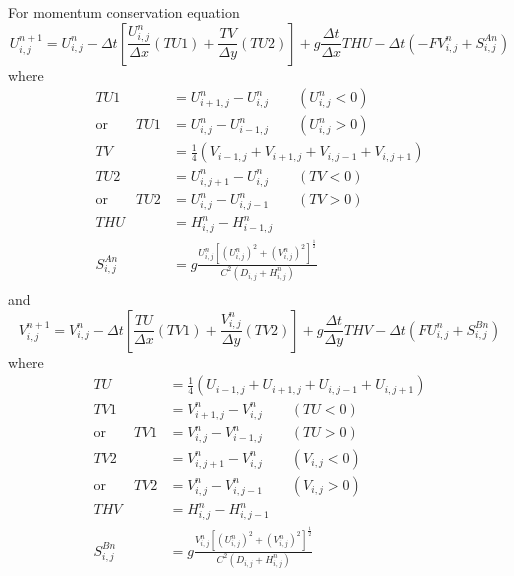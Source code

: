 \documentclass[10pt,a4paper]{article}
\begin{document}
For momentum conservation equation
\begin{equation}
	U_{i, j}^{n+1} = U_{i, j}^n - \Delta t\left[\frac{U_{i, j}^n}{\Delta x}(TU1) + \frac{TV}{\Delta y}(TU2)\right] + g\frac{\Delta t}{\Delta x}THU - \Delta t\left(-FV_{i, j}^n + S_{i, j}^{An}\right)
\end{equation}
where
\begin{equation}
	\begin{aligned}
		TU1 &= U_{i+1, j}^n - U_{i, j}^n\qquad (U_{i, j}^n < 0)\\
		\mbox{or} \qquad TU1 &= U_{i, j}^n - U_{i-1, j}^n\qquad (U_{i, j}^n > 0)\\
		TV &= \frac{1}{4}\left(V_{i-1, j} + V_{i+1, j} + V_{i, j-1} + V_{i, j+1}\right)\\
		TU2 &= U_{i, j+1}^n - U_{i, j}^n\qquad (TV < 0) \\
		\mbox{or} \qquad TU2 &= U_{i, j}^n - U_{i, j-1}^n\qquad (TV > 0) \\
		THU &= H_{i, j}^n - H_{i-1, j}^n \\
		S_{i, j}^{An} &= g\frac{U_{i, j}^n\left[(U_{i, j}^n)^2 + (V_{i, j}^n)^2\right]^{\frac{1}{2}}}{C^2(D_{i, j}+H_{i, j}^n)} \\
	\end{aligned}
\end{equation}
and
\begin{equation}
	V_{i, j}^{n+1} = V_{i, j}^n - \Delta t\left[\frac{TU}{\Delta x}(TV1) + \frac{V_{i, j}^n}{\Delta y}(TV2)\right] + g\frac{\Delta t}{\Delta y}THV - \Delta t\left(FU_{i, j}^n + S_{i, j}^{Bn}\right)
\end{equation}
where
\begin{equation}
	\begin{aligned}
		TU &= \frac{1}{4}\left(U_{i-1, j} + U_{i+1, j} + U_{i, j-1} + U_{i, j+1}\right)\\
		TV1 &= V_{i+1, j}^n - V_{i, j}^n\qquad (TU < 0)\\
		\mbox{or} \qquad TV1 &= V_{i, j}^n - V_{i-1, j}^n\qquad (TU > 0)\\
		TV2 &= V_{i, j+1}^n - V_{i, j}^n\qquad (V_{i, j} < 0) \\
		\mbox{or} \qquad TV2 &= V_{i, j}^n - V_{i, j-1}^n\qquad (V_{i, j} > 0) \\
		THV &= H_{i, j}^n - H_{i, j-1}^n \\
		S_{i, j}^{Bn} &= g\frac{V_{i, j}^n\left[(U_{i, j}^n)^2 + (V_{i, j}^n)^2\right]^{\frac{1}{2}}}{C^2(D_{i, j}+H_{i, j}^n)} \\
	\end{aligned}
\end{equation}
\end{document}
